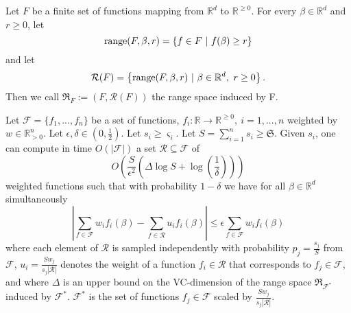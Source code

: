 \begin{definition}
    Let $F$ be a finite set of functions mapping from $\mathbb{R}^d$ to $\mathbb{R}^{\geq 0}$.
    For every $\beta \in \mathbb{R}^d$ and $r \geq 0$, let
    \begin{equation*}
        \textup{range}(F, \beta, r) = \left\{ f \in F \ | \  f(\beta) \geq r  \right\}
    \end{equation*}
    and let
    \begin{equation*}
        \mathcal{R}(F) = \left\{ \textup{range}(F, \beta, r) \ | \ \beta \in \mathbb{R}^d, \ r \geq 0  \right\}.
    \end{equation*}
    Then we call $\mathfrak{R}_F := (F, \mathcal{R}(F))$ the range space induced by F.
\end{definition}

\begin{theorem}
    Let $\mathcal{F} = \{ f_1, ..., f_n \}$ be a set of functions,
    $f_i: \mathbb{R} \rightarrow \mathbb{R}^{\geq 0}, \ i=1,...,n$ weighted by
    $w \in \mathbb{R}^n_{>0}$.
    Let $\epsilon, \delta \in (0, \frac{1}{2})$.
    Let $s_i \geq \varsigma_i$.
    Let $S = \sum_{i=1}^n s_i \geq \mathfrak{S}$.
    Given $s_i$, one can compute in time $O(|\mathcal{F}|)$ a set
    $\mathcal{R} \subseteq \mathcal{F}$ of
    \begin{equation*}
        O \left( \frac{S}{\epsilon^2} \left( \Delta \log S + \log \left( \frac{1}{\delta} \right) \right) \right)
    \end{equation*}
    weighted functions such that with probability $1 - \delta$ we have
    for all $\beta \in \mathbb{R}^d$ simultaneously
    \begin{equation*}
        \left| \sum_{f \in \mathcal{F}} w_i f_i(\beta) - \sum_{f \in \mathcal{R}} u_i f_i(\beta) \right| \leq \epsilon \sum_{f \in \mathcal{F}} w_i f_i(\beta)
    \end{equation*}
    where each element of $\mathcal{R}$ is sampled independently with probability
    $p_j = \frac{s_j}{S}$ from $\mathcal{F}$, $u_i = \frac{S w_j}{s_j |\mathcal{R}|}$
    denotes the weight of a function $f_i \in \mathcal{R}$ that corresponds to
    $f_j \in \mathcal{F}$, and where $\Delta$ is an upper bound on the
    VC-dimension of the range space $\mathfrak{R}_{\mathcal{F}^*}$ induced by
    $\mathcal{F}^*$. $\mathcal{F}^*$ is the set of functions $f_j \in \mathcal{F}$
    scaled by $\frac{S w_j}{s_j |\mathcal{R}|}$.
\end{theorem}

